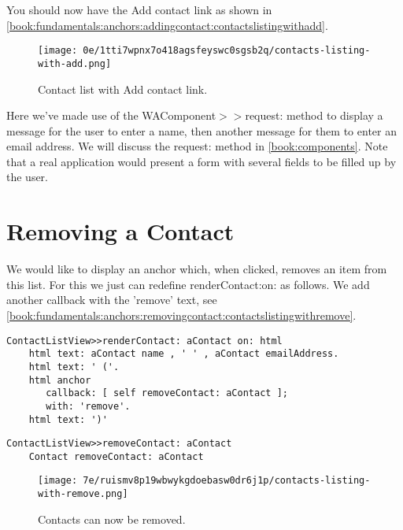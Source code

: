\documentclass[a4paper,10pt,twoside]{book}
\newcommand{\ct}[1]{{\small\ttfamily\textup{#1}}}
\begin{document}
You should now have the Add contact link as shown in \autoref{book:fundamentals:anchors:addingcontact:contactslistingwithadd}.

\begin{figure}[h!tbp]
	\begin{center}
		\texttt{[image: 0e/1tti7wpnx7o418agsfeyswc0sgsb2q/contacts-listing-with-add.png]}
		\caption{Contact list with Add contact link.\label{book:fundamentals:anchors:addingcontact:contactslistingwithadd}}
	\end{center}
\end{figure}


Here we've made use of the  \ct{WAComponent$>$$>$request:} method to display a message for the user to enter a name, then another message for them to enter an email address. We will discuss the \ct{request:} method in \autoref{book:components}. Note that a real application would present a form with several fields to be filled up by the user.

\section{Removing a Contact}
\label{book:fundamentals:anchors:removingcontact}

We would like to display an anchor which, when clicked, removes an item from this list. For this we just can redefine \ct{renderContact:on:} as follows. We add another callback with the 'remove' text, see \autoref{book:fundamentals:anchors:removingcontact:contactslistingwithremove}.

\begin{lstlisting}
ContactListView>>renderContact: aContact on: html
    html text: aContact name , ' ' , aContact emailAddress.
    html text: ' ('.
    html anchor
       callback: [ self removeContact: aContact ];
       with: 'remove'.
    html text: ')'
\end{lstlisting}

\begin{lstlisting}
ContactListView>>removeContact: aContact
    Contact removeContact: aContact
\end{lstlisting}

\begin{figure}[h!tbp]
	\begin{center}
		\texttt{[image: 7e/ruismv8p19wbwykgdoebasw0dr6j1p/contacts-listing-with-remove.png]}
		\caption{Contacts can now be removed.\label{book:fundamentals:anchors:removingcontact:contactslistingwithremove}}
	\end{center}
\end{figure}
\end{document}
